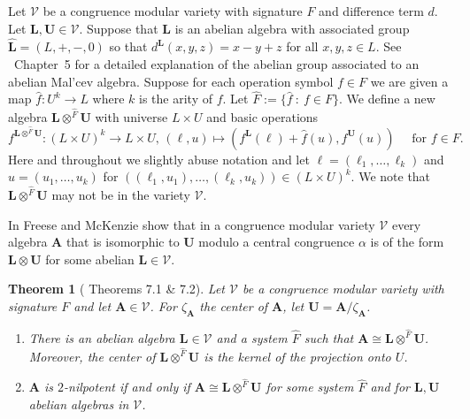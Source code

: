 \documentclass[10pt,a4paper]{amsart}
\numberwithin{equation}{section}
\newtheorem{theorem}{Theorem}[section]
\newcommand{\st}{\ :\ }
\newcommand{\A}{\mathbf{A}}
\renewcommand{\L}{\mathbf{L}}
\newcommand{\U}{\mathbf{U}}
\newcommand{\V}{\mathcal{V}}
\begin{document}
Let $\V$ be a congruence modular variety with signature $F$ and difference term $d$. 
Let $\L, \U \in \V$. Suppose that $\L$ is an abelian algebra with associated group 
  $\hat{\L} = (L, +, -, 0)$ 
  so that $d^\L(x,y,z) = x-y+z$ for all $x,y,z \in L$. 
See \cite{FM:CTC}~Chapter~5 for a detailed explanation of the abelian group associated 
  to an abelian Mal'cev algebra.
Suppose for each operation symbol $f \in F$ we are given a map $\hat{f} \colon U^k \rightarrow L$ 
  where $k$ is the arity of $f$. 
Let $\hat{F} := \{\hat{f} \st f \in F\}$. We define a new algebra $\L \otimes^{\hat{F}} \U$ 
  with universe $L \times U$ and basic operations 
  \[f^{\L \otimes^{\hat{F}} \U} \colon (L \times U)^k \rightarrow L \times U, \, (\ell, u) \mapsto (f^\L(\ell) + \hat{f}(u), f^\U(u)) \quad \text{ for } f \in F. \]
Here and throughout we slightly abuse notation and let $\ell = (\ell_1,\dots,\ell_k)$ 
  and $u = (u_1,\dots,u_k)$ for $( (\ell_1,u_1),\dots,(\ell_k,u_k) ) \in (L\times U)^k$.
We note that $\L \otimes^{\hat{F}} \U$ may not be in the variety $\V$. 
 
In \cite{FM:CTC} Freese and McKenzie show that in a congruence modular variety $\V$ every algebra $\A$
  that is isomorphic to $\U$ modulo a central congruence $\alpha$ is of the form $\L\otimes\U$ 
  for some abelian $\L\in \V$.
 
\begin{theorem}[\cite{FM:CTC} Theorems 7.1 \& 7.2] 
  Let $\V$ be a congruence modular variety with signature $F$ and let $\A \in \V$. 
  For $\zeta_\A$ the center of $\A$, let $\U = \A/\zeta_\A$.
  \begin{enumerate}
    \item  
      There is an abelian algebra $\L \in \V$ and a system $\hat{F}$ such that $\A \cong \L \otimes^{\hat{F}}\U$. 
      Moreover, the center of $\L \otimes^{\hat{F}} \U$ is the kernel of the projection onto $U$. 
    \item 
      $\A$ is $2$-nilpotent if and only if $\A \cong \L \otimes^{\hat{F}}\U$ for some system $\hat{F}$ 
        and for $\L, \U$ abelian algebras in $\V$. 
  \end{enumerate}
\end{theorem}
 
\end{document}
